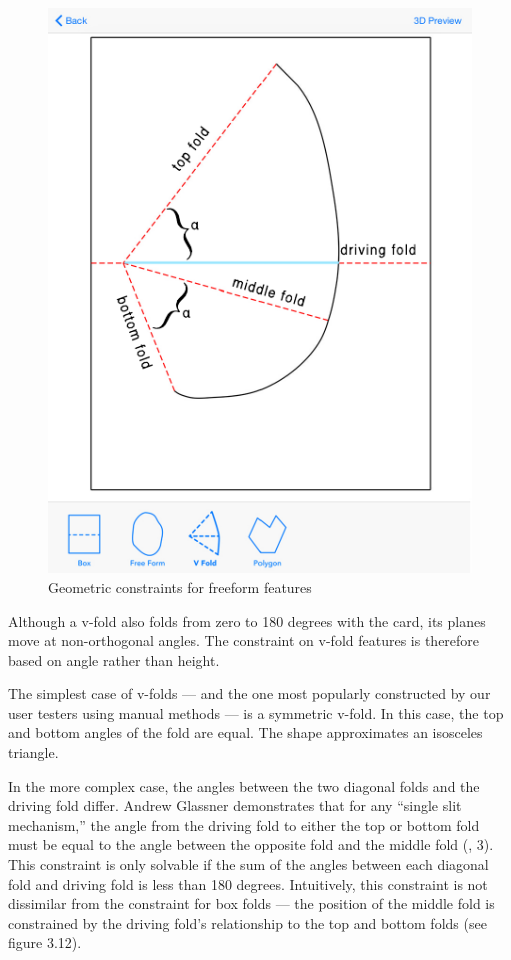 \begin{figure}[htbp]
\centering
\includegraphics{figures/45_Tech_Constraints/vfoldConstraints.pdf}
\caption{Geometric constraints for freeform features}
\end{figure}

Although a v-fold also folds from zero to 180 degrees with the card, its
planes move at non-orthogonal angles. The constraint on v-fold features
is therefore based on angle rather than height.

The simplest case of v-folds --- and the one most popularly constructed
by our user testers using manual methods --- is a symmetric v-fold. In
this case, the top and bottom angles of the fold are equal. The shape
approximates an isosceles triangle.

In the more complex case, the angles between the two diagonal folds and
the driving fold differ. Andrew Glassner demonstrates that for any
``single slit mechanism,'' the angle from the driving fold to either the
top or bottom fold must be equal to the angle between the opposite fold
and the middle fold (\citet{glassner1998interactive}, 3). This
constraint is only solvable if the sum of the angles between each
diagonal fold and driving fold is less than 180 degrees. Intuitively,
this constraint is not dissimilar from the constraint for box folds ---
the position of the middle fold is constrained by the driving fold's
relationship to the top and bottom folds (see figure 3.12).

